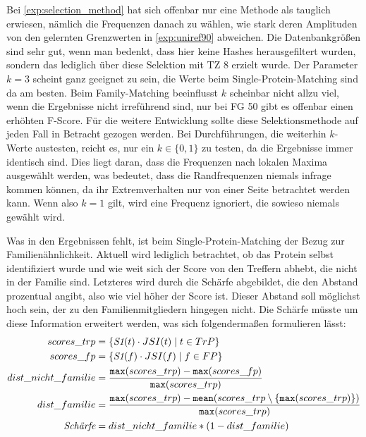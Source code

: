    Bei \autoref{exp:selection_method} hat sich offenbar nur eine Methode als tauglich erwiesen, nämlich die Frequenzen danach zu wählen, wie stark deren Amplituden von den gelernten Grenzwerten in \autoref{exp:uniref90} abweichen. Die Datenbankgrößen sind sehr gut, wenn man bedenkt, dass hier keine Hashes herausgefiltert wurden, sondern das lediglich über diese Selektion mit \ac{TZ} 8 erzielt wurde. Der Parameter $k=3$ scheint ganz geeignet zu sein, die Werte beim Single-Protein-Matching sind da am besten. Beim Family-Matching beeinflusst $k$ scheinbar nicht allzu viel, wenn die Ergebnisse nicht irreführend sind, nur bei \ac{FG} 50 gibt es offenbar einen erhöhten F-Score. Für die weitere Entwicklung sollte diese Selektionsmethode auf jeden Fall in Betracht gezogen werden. Bei Durchführungen, die weiterhin $k$-Werte austesten, reicht es, nur ein $k \in \{0, 1\}$ zu testen, da die Ergebnisse immer identisch sind. Dies liegt daran, dass die Frequenzen nach lokalen Maxima ausgewählt werden, was bedeutet, dass die Randfrequenzen niemals infrage kommen können, da ihr Extremverhalten nur von einer Seite betrachtet werden kann. Wenn also $k=1$ gilt, wird eine Frequenz ignoriert, die sowieso niemals gewählt wird.

    Was in den Ergebnissen fehlt, ist beim Single-Protein-Matching der Bezug zur Familienähnlichkeit. Aktuell wird lediglich betrachtet, ob das Protein selbst identifiziert wurde und wie weit sich der Score von den Treffern abhebt, die nicht in der Familie sind. Letzteres wird durch die Schärfe abgebildet, die den Abstand prozentual angibt, also wie viel höher der Score ist. Dieser Abstand soll möglichst hoch sein, der zu den Familienmitgliedern hingegen nicht. Die Schärfe müsste um diese Information erweitert werden, was sich folgendermaßen formulieren lässt:
    \begin{equation}
        \label{equ:}
        \begin{split}
            scores\_trp &= \{\emph{S1}(t) \cdot JSI(t) \mid t \in TrP\}\\
            scores\_fp &= \{\emph{S1}(f) \cdot JSI(f) \mid f \in FP\}\\
            dist\_nicht\_familie &= \frac{\texttt{max}(scores\_trp) - \texttt{max}(scores\_fp)}{\texttt{max}(scores\_trp)}\\
            dist\_familie &= \frac{\texttt{max}(scores\_trp) - \texttt{mean}(scores\_trp \setminus \{\texttt{max}(scores\_trp)\})}{\texttt{max}(scores\_trp)}\\
            \emph{Schärfe} &= dist\_nicht\_familie * (1 - dist\_familie)
        \end{split}
    \end{equation}

